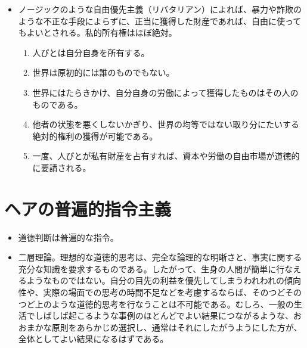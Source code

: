 \documentclass[]{jsarticle}
\begin{document}
\begin{itemize}

\item ノージックのような自由優先主義（リバタリアン）によれば、暴力や詐欺のような不正な手段によらずに、正当に獲得した財産であれば、自由に使ってもよいとされる。私的所有権はほぼ絶対。

  \begin{enumerate}
  \item 人びとは自分自身を所有する。
  \item 世界は原初的には誰のものでもない。
  \item 世界にはたらきかけ、自分自身の労働によって獲得したものはその人のものである。
  \item 他者の状態を悪くしないかぎり、世界の均等ではない取り分にたいする絶対的権利の獲得が可能である。
   \item 一度、人びとが私有財産を占有すれば、資本や労働の自由市場が道徳的に要請される。
  \end{enumerate}


\end{itemize}

\section{ヘアの普遍的指令主義}
\begin{itemize}
\item 道徳判断は普遍的な指令。
\item 二層理論。理想的な道徳的思考は、完全な論理的な明晰さと、事実に関する充分な知識を要求するものである。したがって、生身の人間が簡単に行なえるようなものではない。自分の目先の利益を優先してしまうわれわれの傾向性や、実際の場面での思考の時間不足などを考慮するならば、そのつどそのつど上のような道徳的思考を行なうことは不可能である。むしろ、一般の生活でしばしば起こるような事例のほとんどでよい結果につながるような、おおまかな原則をあらかじめ選択し、通常はそれにしたがうようにした方が、全体としてよい結果になるはずである。
\end{itemize}






\nocite{rawls71:_theor_of_justic}
\nocite{nozick74:_anarc_state_and_utopia}
\nocite{hare81:_moral_think}
\end{document}

